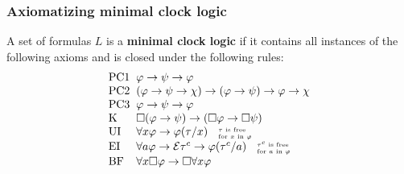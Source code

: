\documentclass[xcolor=x11names]{beamer}
\renewcommand{\emph}[1]{\textbf{#1}}
\newcommand{\lthen}{\rightarrow}
\newenvironment{tomb}[2][.1]{\arraycolsep=#1cm\begin{array}{#2}}{\end{array}}
\begin{document}
\begin{frame}
	\frametitle{Axiomatizing minimal clock logic}
\footnotesize
A set of formulas $L$ is a \emph{minimal clock logic} if it contains all instances of the following axioms and is closed under the following rules:
\[\begin{tomb}[.1]{ll}
        \mathrm{PC1} & \varphi \lthen \psi \lthen \varphi
\\      \mathrm{PC2} & (\varphi \lthen \psi \lthen \chi) \lthen (\varphi \lthen \psi ) \lthen \varphi \lthen \chi
\\      \mathrm{PC3} & \varphi \lthen \psi \lthen \varphi
\\      \mathrm{K}   & \Box (\varphi \lthen \psi) \lthen (\Box \varphi \lthen \Box \psi)
\\      \mathrm{UI}  & \forall x \varphi \lthen \varphi (\tau/x)
        \textup{ \tiny \begin{tabular}{l}$\tau$ is free \\ for $x$ in $\varphi$ \end{tabular}}
\\      \mathrm{EI}  & \forall a \varphi \lthen \mathcal E \tau^c \lthen \varphi (\tau^c /a)
        \textup{ \tiny \begin{tabular}{l}$\tau^c$ is free \\ for $a$ in $\varphi$ \end{tabular}}
\\      \mathrm{BF}  & \forall x \Box \varphi \lthen \Box \forall x \varphi

\end{tomb}\]
\end{frame}
\end{document}
